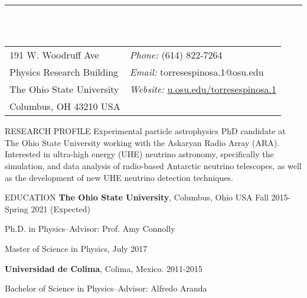 \documentclass{resume} %
\newenvironment{list1}{
  \begin{list}{\ding{113}}{%
      \setlength{\itemsep}{0in}
      \setlength{\parsep}{0in} \setlength{\parskip}{0in}
      \setlength{\topsep}{0in} \setlength{\partopsep}{0in} 
      \setlength{\leftmargin}{0.17in}}}{\end{list}}
\begin{document}

\vspace{-1cm}
\rule{\textwidth}{0.1cm} \\ \\
\begin{tabular}{@{}p{2in}p{4in}}
191 W. Woodruff Ave             & {\it Phone:}  (614) 822-7264\\            
Physics Research Building   & {\it Email:}  torresespinosa.1@osu.edu \\         
The Ohio State University  & {\it Website:} \url{u.osu.edu/torresespinosa.1}  \\       
Columbus, OH  43210 USA  \\     
\end{tabular}


\begin{rSection}{RESEARCH PROFILE}
Experimental particle astrophysics PhD candidate at The Ohio State University working with the Askaryan Radio Array (ARA). Interested in ultra-high energy (UHE) neutrino astronomy, specifically the simulation, and data analysis of radio-based Antarctic neutrino telescopes, as well as the development of new UHE neutrino detection techniques.
\end{rSection}


\begin{rSection}{EDUCATION}
\textbf{The Ohio State University}, Columbus, Ohio USA \hfill Fall 2015-Spring 2021 (Expected)\\
\vspace*{-.15in}
\begin{list1}
\item[] Ph.D. in Physics--Advisor: Prof. Amy Connolly
\item [] Master of Science in Physics, July 2017
\end{list1}

\textbf{Universidad de Colima}, Colima, Mexico. \hfill 2011-2015\\
\vspace*{-.15in}
\begin{list1}
\item[] Bachelor of Science in Physics--Advisor: Alfredo Aranda
\end{list1}
\end{rSection}
\end{document}
